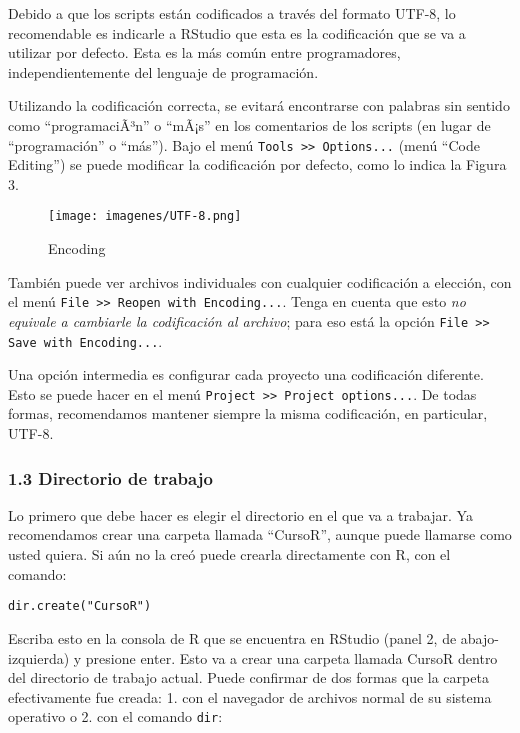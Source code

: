 \documentclass[]{article}
\makeatletter
\def\maxwidth{\ifdim\Gin@nat@width>\linewidth\linewidth
\else\Gin@nat@width\fi}
\let\Oldincludegraphics\includegraphics
\renewcommand{\includegraphics}[1]{\Oldincludegraphics[width=\maxwidth]{#1}}
\makeatother
\begin{document}
Debido a que los scripts están codificados a través del formato UTF-8,
lo recomendable es indicarle a RStudio que esta es la codificación que
se va a utilizar por defecto. Esta es la más común entre programadores,
independientemente del lenguaje de programación.

Utilizando la codificación correcta, se evitará encontrarse con palabras
sin sentido como ``programaciÃ³n'' o ``mÃ¡s'' en los comentarios de los
scripts (en lugar de ``programación'' o ``más''). Bajo el menú
\texttt{Tools \textgreater{}\textgreater{} Options...} (menú ``Code
Editing'') se puede modificar la codificación por defecto, como lo
indica la Figura 3.

\begin{figure}[htbp]
\centering
\texttt{[image: imagenes/UTF-8.png]}
\caption{Encoding}
\end{figure}

También puede ver archivos individuales con cualquier codificación a
elección, con el menú
\texttt{File \textgreater{}\textgreater{} Reopen with Encoding...}.
Tenga en cuenta que esto \emph{no equivale a cambiarle la codificación
al archivo}; para eso está la opción
\texttt{File \textgreater{}\textgreater{} Save with Encoding...}.

Una opción intermedia es configurar cada proyecto una codificación
diferente. Esto se puede hacer en el menú
\texttt{Project \textgreater{}\textgreater{} Project options...}. De
todas formas, recomendamos mantener siempre la misma codificación, en
particular, UTF-8.

\subsubsection{1.3 Directorio de trabajo}

Lo primero que debe hacer es elegir el directorio en el que va a
trabajar. Ya recomendamos crear una carpeta llamada ``CursoR'', aunque
puede llamarse como usted quiera. Si aún no la creó puede crearla
directamente con R, con el comando:

\begin{verbatim}
dir.create("CursoR")
\end{verbatim}
Escriba esto en la consola de R que se encuentra en RStudio (panel 2, de
abajo-izquierda) y presione enter. Esto va a crear una carpeta llamada
CursoR dentro del directorio de trabajo actual. Puede confirmar de dos
formas que la carpeta efectivamente fue creada: 1. con el navegador de
archivos normal de su sistema operativo o 2. con el comando
\texttt{dir}:
\end{document}
